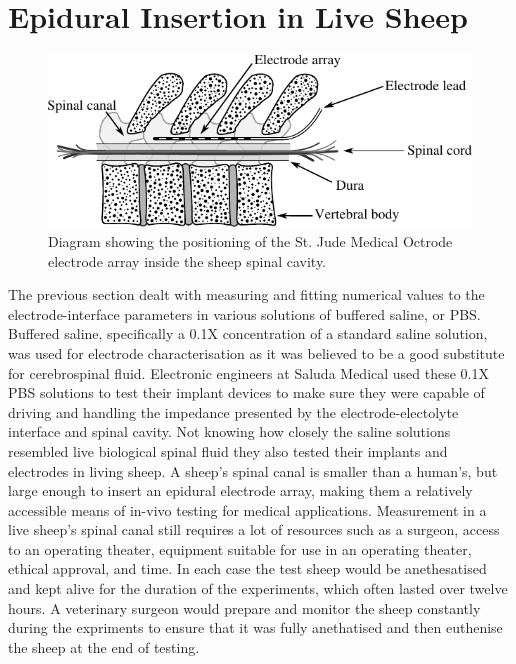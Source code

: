 \section{Epidural Insertion in Live Sheep}
  \label{sect:sheep_measurements}


  \begin{figure}
    \centering
    \includegraphics{content/pt2/08-InterfaceParameters/graphics/sheepSpine}
    \caption{\label{fig:sheepSpine} Diagram showing the positioning of the St. Jude Medical Octrode electrode array inside the sheep spinal cavity.}
  \end{figure}

  The previous section dealt with measuring and fitting numerical values to the electrode-interface parameters in various solutions of buffered saline, or PBS.
  Buffered saline, specifically a 0.1X concentration of a standard saline solution, was used for electrode characterisation as it was believed to be a good substitute for cerebrospinal fluid.
  Electronic engineers at Saluda Medical used these 0.1X PBS solutions to test their implant devices to make sure they were capable of driving and handling the impedance presented by the electrode-electolyte interface and spinal cavity.
  Not knowing how closely the saline solutions resembled live biological spinal fluid they also tested their implants and electrodes in living sheep.
  A sheep's spinal canal is smaller than a human's, but large enough to insert an epidural electrode array, making them a relatively accessible means of in-vivo testing for medical applications.
  Measurement in a live sheep's spinal canal still requires a lot of resources such as a surgeon, access to an operating theater, equipment suitable for use in an operating theater, ethical approval, and time.
  In each case the test sheep would be anethesatised and kept alive for the duration of the experiments, which often lasted over twelve hours.
  A veterinary surgeon would prepare and monitor the sheep constantly during the expriments to ensure that it was fully anethatised and then euthenise the sheep at the end of testing.

